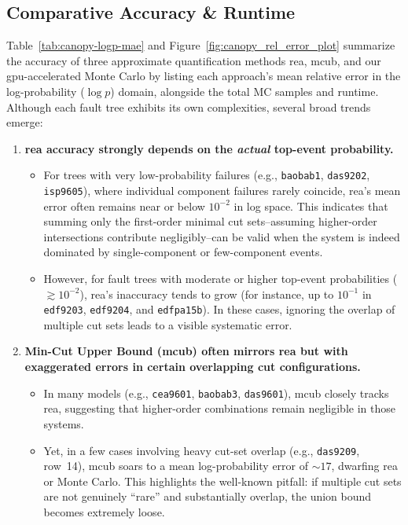 \subsection{Comparative Accuracy \& Runtime}

Table~\ref{tab:canopy-logp-mae} and Figure~\ref{fig:canopy_rel_error_plot} summarize the accuracy of three approximate quantification methods \acrfull{rea}, \acrfull{mcub}, and our \acrshort{gpu}-accelerated Monte Carlo by listing each approach's mean relative error in the log-probability (\(\log p\)) domain, alongside the total MC samples and runtime. Although each fault tree exhibits its own complexities, several broad trends emerge:

\begin{enumerate}
    \item \textbf{\acrshort{rea} accuracy strongly depends on the \emph{actual} top-event probability.}
    \begin{itemize}
        \item For trees with very low-probability failures (e.g., \texttt{baobab1}, \texttt{das9202}, \texttt{isp9605}), where individual component failures rarely coincide, \acrshort{rea}'s mean error often remains near or below \(10^{-2}\) in log space. This indicates that summing only the first-order minimal cut sets--assuming higher-order intersections contribute negligibly--can be valid when the system is indeed dominated by single-component or few-component events.
        \item However, for fault trees with moderate or higher top-event probabilities (\(\gtrsim 10^{-2}\)), \acrshort{rea}'s inaccuracy tends to grow (for instance, up to \(10^{-1}\) in \texttt{edf9203}, \texttt{edf9204}, and \texttt{edfpa15b}). In these cases, ignoring the overlap of multiple cut sets leads to a visible systematic error.
    \end{itemize}

    \item \textbf{Min-Cut Upper Bound (\acrshort{mcub}) often mirrors \acrshort{rea} but with exaggerated errors in certain overlapping cut configurations.}
    \begin{itemize}
        \item In many models (e.g., \texttt{cea9601}, \texttt{baobab3}, \texttt{das9601}), \acrshort{mcub} closely tracks \acrshort{rea}, suggesting that higher-order combinations remain negligible in those systems.
        \item Yet, in a few cases involving heavy cut-set overlap (e.g., \texttt{das9209}, row~14), \acrshort{mcub} soars to a mean log-probability error of \(\sim 17\), dwarfing \acrshort{rea} or Monte Carlo. This highlights the well-known pitfall: if multiple cut sets are not genuinely ``rare'' and substantially overlap, the union bound becomes extremely loose.
    \end{itemize}


\end{enumerate}
